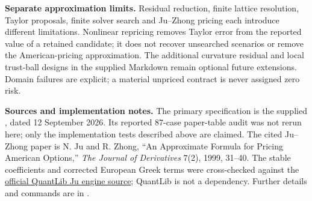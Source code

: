 \documentclass[11pt,a4paper]{article}
\begin{document}
\textbf{Separate approximation limits.}
Residual reduction, finite lattice resolution, Taylor proposals, finite solver
search and Ju--Zhong pricing each introduce different limitations. Nonlinear
repricing removes Taylor error from the reported value of a retained candidate;
it does not recover unsearched scenarios or remove the American-pricing
approximation. The additional curvature residual and local trust-ball designs
in the supplied Markdown remain optional future extensions. Domain failures
are explicit; a material unpriced contract is never assigned zero risk.

\textbf{Sources and implementation notes.}
The primary specification is the supplied ,
dated 12 September 2026. Its reported 87-case paper-table audit was not rerun
here; only the implementation tests described above are claimed. The cited
Ju--Zhong paper is N. Ju and R. Zhong, ``An Approximate Formula for Pricing
American Options,'' \emph{The Journal of Derivatives} 7(2), 1999, 31--40.
The stable coefficients and corrected European Greek terms were cross-checked
against the \href{https://github.com/lballabio/QuantLib/blob/master/ql/pricingengines/vanilla/juquadraticengine.cpp}{official QuantLib Ju engine source};
QuantLib is not a dependency. Further details and commands are in
.
\end{document}
